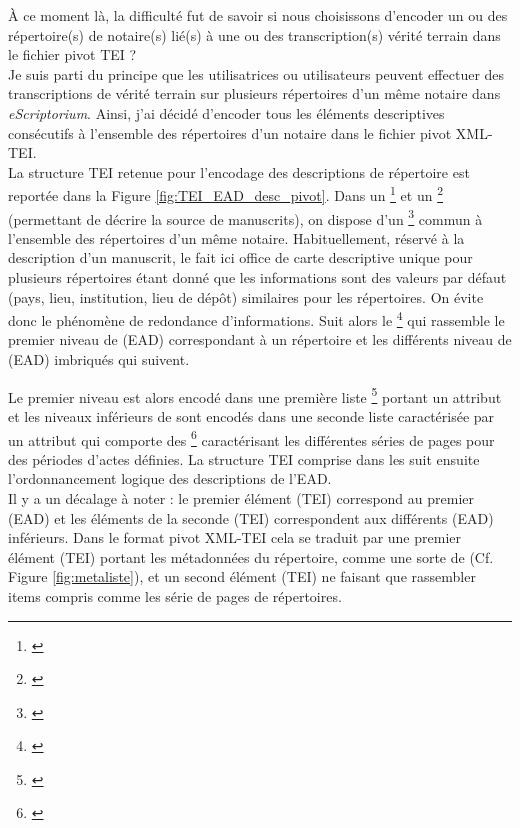 À ce moment là, la difficulté fut de savoir si nous choisissons d'encoder un ou des répertoire(s) de notaire(s) lié(s) à une ou des transcription(s) vérité terrain dans le fichier pivot TEI ?\\

Je suis parti du principe que les utilisatrices ou utilisateurs peuvent effectuer des transcriptions de vérité terrain sur plusieurs répertoires d'un même notaire dans \textit{eScriptorium}. Ainsi, j'ai décidé d'encoder tous les éléments descriptives consécutifs à l'ensemble des répertoires d'un notaire dans le fichier pivot XML-TEI.\\

La structure TEI retenue pour l'encodage des descriptions de répertoire est reportée dans la Figure \ref{fig:TEI_EAD_desc_pivot}. Dans un \footnote{\cite{tei_tei_nodate-6}} et un \footnote{\cite{tei_tei_nodate-4}} (permettant de décrire la source de manuscrits), on dispose d'un \footnote{\cite{tei_tei_nodate-22}} commun à l'ensemble des répertoires d'un même notaire. Habituellement, réservé à la description d'un manuscrit, le  fait ici office de carte descriptive unique pour plusieurs répertoires étant donné que les informations sont des valeurs par défaut (pays, lieu, institution, lieu de dépôt) similaires pour les répertoires. On évite donc le phénomène de redondance d'informations. Suit alors le \footnote{\cite{tei_tei_nodate-5}} qui rassemble le premier niveau de  (EAD) correspondant à un répertoire et les différents niveau de  (EAD) imbriqués qui suivent. 

Le premier niveau est alors encodé dans une première liste \footnote{\cite{tei_tei_nodate-21}} portant un attribut   et les niveaux inférieurs de  sont encodés dans une seconde liste  caractérisée par un attribut   qui comporte des \footnote{\cite{tei_tei_nodate-20}}  caractérisant les différentes séries de pages pour des périodes d'actes définies. La structure TEI comprise dans les  suit ensuite l'ordonnancement logique des descriptions de l'EAD.\\

Il y a un décalage à noter : le premier élément  (TEI) correspond au premier  (EAD) et les éléments  de la seconde  (TEI) correspondent aux différents  (EAD) inférieurs. Dans le format pivot XML-TEI cela se traduit par une premier élément  (TEI) portant les métadonnées du répertoire, comme une sorte de  (Cf. Figure \ref{fig:metaliste}), et un second élément  (TEI) ne faisant que rassembler items compris comme les série de pages de répertoires.

